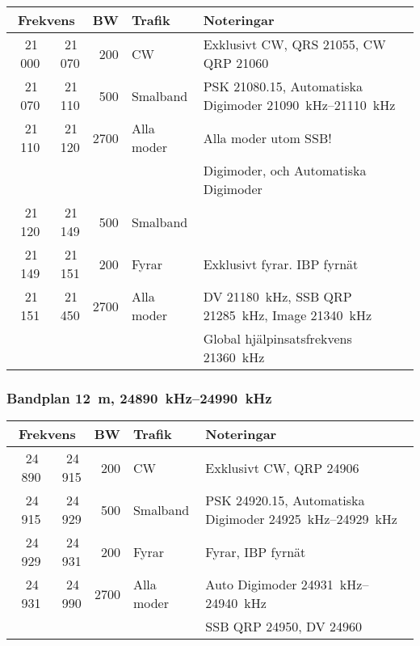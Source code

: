 \begin{tabular}{rrrll}
\multicolumn{2}{c}{\textbf{Frekvens}} & \textbf{BW} & \textbf{Trafik} & \textbf{Noteringar} \\ \hline

21\,000 & 21\,070 & 200  & CW         & Exklusivt CW, QRS \num{21055}, CW QRP \num{21060}                                          \\ \hline
21\,070 & 21\,110 & 500  & Smalband   & PSK \num{21080,15}, Automatiska Digimoder \SIrange{21090}{21110}{\kilo\hertz}              \\
21\,110 & 21\,120 & 2700 & Alla moder & Alla moder utom SSB!                                                                       \\
        &         &      &            & Digimoder, och Automatiska Digimoder                                                       \\ \hline
21\,120 & 21\,149 & 500  & Smalband   &                                                                                            \\ \hline
21\,149 & 21\,151 & 200  & Fyrar      & Exklusivt fyrar. IBP fyrnät                                                                \\ \hline
21\,151 & 21\,450 & 2700 & Alla moder & DV \SI{21180}{\kilo\hertz}, SSB QRP \SI{21285}{\kilo\hertz}, Image \SI{21340}{\kilo\hertz} \\
        &         &      &            & Global hjälpinsatsfrekvens \SI{21360}{\kilo\hertz}                                         \\ \hline
\end{tabular}

\subsubsection{Bandplan \SI{12}{\metre}, \SIrange{24890}{24990}{\kilo\hertz}}
\begin{tabular}{rrrll}
\multicolumn{2}{c}{\textbf{Frekvens}} & \textbf{BW} & \textbf{Trafik} & \textbf{Noteringar} \\ \hline

24\,890 & 24\,915 & 200  & CW         & Exklusivt CW, QRP \num{24906}                      \\ \hline
24\,915 & 24\,929 & 500  & Smalband   & PSK \num{24920,15}, Automatiska
                                        Digimoder \SIrange{24925}{24929}{\kilo\hertz}      \\ \hline
24\,929 & 24\,931 & 200  & Fyrar      & Fyrar, IBP fyrnät                                  \\ \hline
24\,931 & 24\,990 & 2700 & Alla moder & Auto Digimoder \SIrange{24931}{24940}{\kilo\hertz} \\
        &         &      &            & SSB QRP \num{24950}, DV \num{24960}{}              \\ \hline
\end{tabular}

